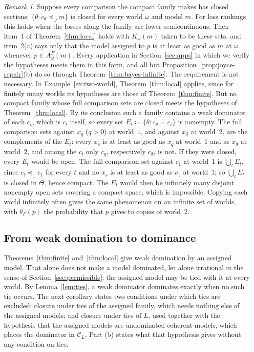 \documentclass[11pt]{article}
\theoremstyle{definition}
\theoremstyle{remark}
\newtheorem{remark}[theorem]{Remark}
\newcommand{\C}{\mathcal C}
\begin{document}
\begin{remark}\label{rem:closed-comparisons}
Suppose every comparison the compact family makes has closed sections: $\{\theta:c_\theta\preceq_\omega m\}$ is closed for every world $\omega$ and model $m$. For loss rankings this holds when the losses along the family are lower semicontinuous. Then item~1 of Theorem~\ref{thm:local} holds with $K_\omega(m)$ taken to be these sets, and item~2(a) says only that the model assigned to $p$ is at least as good as $m$ at $\omega$ whenever $p\in A^F_\omega(m)$. Every application in Section~\ref{sec:apps} in which we verify the hypotheses meets them in this form, and all but Proposition~\ref{prop:joyce-repair}(b) do so through Theorem~\ref{thm:bayes-infinite}. The requirement is not necessary. In Example~\ref{ex:two-world}, Theorem~\ref{thm:local} applies, since for finitely many worlds its hypotheses are those of Theorem~\ref{thm:finite}. But no compact family whose full comparison sets are closed meets the hypotheses of Theorem~\ref{thm:local}. By its conclusion such a family contains a weak dominator of each $c_t$, which is $c_t$ itself, so every set $E_t\coloneqq\{\theta:c_\theta=c_t\}$ is nonempty. The full comparison sets against $x_q$ ($q>0$) at world~$1$, and against $x_0$ at world~$2$, are the complements of the $E_t$: every $x_s$ is at least as good as $x_q$ at world~$1$ and as $x_0$ at world~$2$, and among the $c_t$ only $c_q$, respectively $c_0$, is not. If they were closed, every $E_t$ would be open. The full comparison set against $c_1$ at world~$1$ is $\bigcup_tE_t$, since $c_t\preceq_1c_1$ for every $t$ and no $x_s$ is at least as good as $c_1$ at world~$1$; so $\bigcup_tE_t$ is closed in $\Theta$, hence compact. The $E_t$ would then be infinitely many disjoint nonempty open sets covering a compact space, which is impossible. Copying each world infinitely often gives the same phenomenon on an infinite set of worlds, with $\theta_F(p)$ the probability that $p$ gives to copies of world~$2$.
\end{remark}

\subsection{From weak domination to dominance}
Theorems~\ref{thm:finite} and~\ref{thm:local} give weak domination by an assigned model. That alone does not make a model dominated, let alone irrational in the sense of Section~\ref{sec:permissible}: the assigned model may be tied with it at every world. By Lemma~\ref{lem:ties}, a weak dominator dominates exactly when no such tie occurs. The next corollary states two conditions under which ties are excluded: closure under ties of the assigned family, which needs nothing else of the assigned models; and closure under ties of $L$, used together with the hypothesis that the assigned models are undominated coherent models, which places the dominator in $\C_L$. Part (b) states what that hypothesis gives without any condition on ties.
\end{document}
